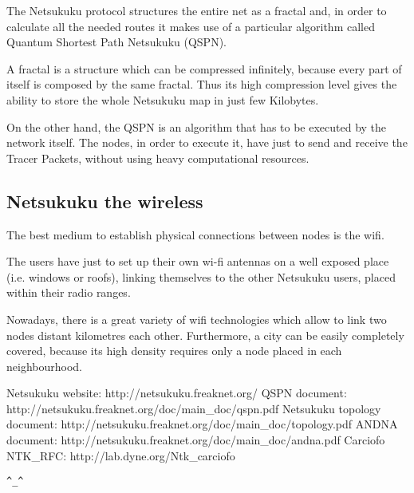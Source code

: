 \documentclass[a4paper]{article}
\newcommand{\href}[2]{ #1 }
\begin{document}
The Netsukuku protocol structures the entire net as a
fractal\cite{ntktopology} and, in order to calculate all the needed routes it
makes use of a particular algorithm called Quantum Shortest Path Netsukuku
(QSPN)\cite{qspndoc}.

A fractal is a structure which can be compressed infinitely, because every
part of itself is composed by the same fractal. Thus its high compression
level gives the ability to store the whole Netsukuku map in just few
Kilobytes.

On the other hand, the QSPN is an algorithm that has to be executed by the
network itself. The nodes, in order to execute it, have just to send and
receive the Tracer Packets, without using heavy computational resources.

\subsection{Netsukuku the wireless}
The best medium to establish physical connections between nodes is the wifi.

The users have just to set up their own wi-fi antennas on a well exposed place 
(i.e. windows or roofs), linking themselves to the other Netsukuku users,
placed within their radio ranges.

Nowadays, there is a great variety of wifi technologies which allow to link
two nodes distant kilometres each other. Furthermore, a city can be easily
completely covered, because its high density requires only a node placed in
each neighbourhood.



\begin{thebibliography}{99}
	 Netsukuku website:
		\href{http://netsukuku.freaknet.org/}{http://netsukuku.freaknet.org/}
	 QSPN document:
		\href{http://netsukuku.freaknet.org/doc/main\_doc/qspn.pdf}{qspn.pdf}
	 Netsukuku topology document:
		\href{http://netsukuku.freaknet.org/doc/main\_doc/topology.pdf}{topology.pdf}
	 ANDNA document:
		\href{http://netsukuku.freaknet.org/doc/main\_doc/andna.pdf}{andna.pdf}
	 Carciofo NTK\_RFC:
		\href{http://lab.dyne.org/Ntk\_carciofo}{Carciofo}

\end{thebibliography}
\newpage

\begin{center}
\verb|^_^|
\end{center}
\end{document}
